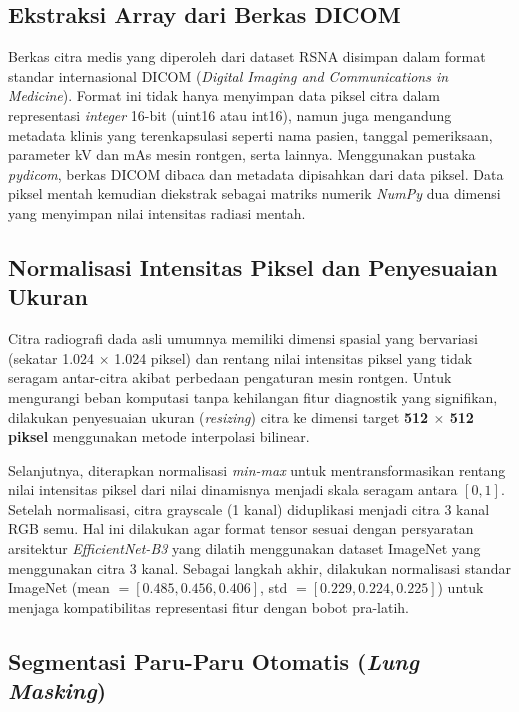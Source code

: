 \documentclass[12pt,a4paper,oneside]{book}
\begin{document}
\subsection{Ekstraksi Array dari Berkas DICOM}

Berkas citra medis yang diperoleh dari dataset RSNA disimpan dalam format standar internasional DICOM (\textit{Digital Imaging and Communications in Medicine}). Format ini tidak hanya menyimpan data piksel citra dalam representasi \textit{integer} 16-bit (uint16 atau int16), namun juga mengandung metadata klinis yang terenkapsulasi seperti nama pasien, tanggal pemeriksaan, parameter kV dan mAs mesin rontgen, serta lainnya. Menggunakan pustaka \textit{pydicom}, berkas DICOM dibaca dan metadata dipisahkan dari data piksel. Data piksel mentah kemudian diekstrak sebagai matriks numerik \textit{NumPy} dua dimensi yang menyimpan nilai intensitas radiasi mentah.

\subsection{Normalisasi Intensitas Piksel dan Penyesuaian Ukuran}

Citra radiografi dada asli umumnya memiliki dimensi spasial yang bervariasi (sekatar 1.024 $\times$ 1.024 piksel) dan rentang nilai intensitas piksel yang tidak seragam antar-citra akibat perbedaan pengaturan mesin rontgen. Untuk mengurangi beban komputasi tanpa kehilangan fitur diagnostik yang signifikan, dilakukan penyesuaian ukuran (\textit{resizing}) citra ke dimensi target \textbf{512 $\times$ 512 piksel} menggunakan metode interpolasi bilinear.

Selanjutnya, diterapkan normalisasi \textit{min-max} untuk mentransformasikan rentang nilai intensitas piksel dari nilai dinamisnya menjadi skala seragam antara $[0, 1]$. Setelah normalisasi, citra grayscale (1 kanal) diduplikasi menjadi citra 3 kanal RGB semu. Hal ini dilakukan agar format tensor sesuai dengan persyaratan arsitektur \textit{EfficientNet-B3} yang dilatih menggunakan dataset ImageNet yang menggunakan citra 3 kanal. Sebagai langkah akhir, dilakukan normalisasi standar ImageNet (mean $= [0.485, 0.456, 0.406]$, std $= [0.229, 0.224, 0.225]$) untuk menjaga kompatibilitas representasi fitur dengan bobot pra-latih.

\subsection{Segmentasi Paru-Paru Otomatis (\textit{Lung Masking})}
\end{document}
